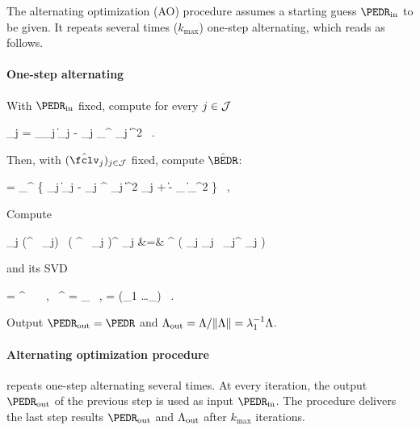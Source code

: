 The alternating optimization (AO) procedure assumes 
a starting guess \( \PEDR_{\init} \) to be given.
It repeats several times (\( k_{\max} \)) one-step alternating, which reads as follows.

\paragraph{One-step alternating} 

\begin{mylist}
\item
With \( \PEDR_{\init} \) fixed, compute for every \( j \in \mathcal{J} \)
\begin{EQA}[c]
	\hat{\fclv}_{j}
	=
	\arginf_{\fclv_{j}} \bigl\| \Imav_{j} - \UV_{j} \PEDR_{\init}^{\T} \fclv_{j} \bigr\|^{2}
	\, .
\end{EQA}


\item 
Then, with \( (\hat{\fclv}_{j})_{j \in \JJJ} \) fixed, compute \( \hat{\BEDR} \):
\begin{EQA}[c]
	\hat{\BEDR}
	=
	\arginf_{\BEDR \in \R^{\dimm \times \dimd}} 
		\biggl\{ \sum_{j \in \JJJ} \bigl\| \Imav_{j} - \UV_{j} \BEDR^{\T} \hat{\fclv}_{j} \bigr\|^{2} \neff_{j}
	+ \lambda \| \BEDR - \PEDR_{\init} \|_{\Fr}^{2} 
	\biggr\}	
	\, ,
\end{EQA}


\item
Compute 
\begin{EQA}[rcl]
	\JEDR
	\eqdef
	\sum_{j \in \JJJ} (\hat{\BEDR}^{\T} \, \hat{\fclv}_{j}) \, \bigl( \hat{\BEDR}^{\T} \, \hat{\fclv}_{j} \bigr)^{\T} \neff_{j}
	&=&
	\hat{\BEDR}^{\T} \Bigl( \sum_{j \in \JJJ} \hat{\fclv}_{j} \, \hat{\fclv}_{j}^{\T} \neff_{j} \Bigr) \hat{\BEDR}
\end{EQA}
and its SVD
\begin{EQA}[c]
	\JEDR
	=
	\PEDR^{\T} \, \Lambda \, \PEDR
	\, ,
	\qquad
	\PEDR \, \PEDR^{\T}
	= 
	\Id_{\dimm}
	\, ,
	\qquad
	\Lambda = \diag(\lambda_{1} \geq \ldots \geq \lambda_{\dimm})
	\, .
\end{EQA}

\item 
Output \( \PEDR_{\outp} = \PEDR \) and \( \Lambda_{\operatorname{out}} = \Lambda/\| \Lambda \| = \lambda_{1}^{-1} \Lambda \).
\end{mylist}


\paragraph{Alternating optimization procedure} repeats
one-step alternating several times.
At every iteration, the output \( \PEDR_{\outp} \) of the previous step is used as input \( \PEDR_{\init} \).
The procedure delivers the last step results \( \PEDR_{\outp} \) and \( \Lambda_{\operatorname{out}} \) after \( k_{\max} \) iterations.

